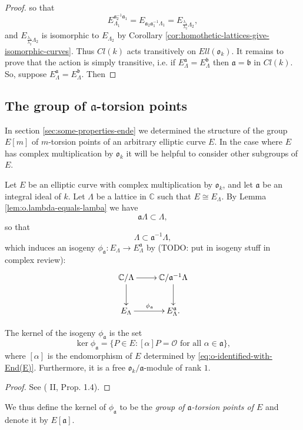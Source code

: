 \begin{proof}
  so that
  \begin{equation*}
    E_{\Lambda_{1}}^{\mathfrak{a}_{2}^{-1}\mathfrak{a}_{1}} =
    E_{\mathfrak{a}_{2}\mathfrak{a}_{1}^{-1}\Lambda_{1}} = E_{\frac{\lambda_{1}}{\lambda_{2}}\Lambda_{2}},
  \end{equation*}
  and $E_{\frac{\lambda_{1}}{\lambda_{2}}\Lambda_{2}}$ is isomorphic to
  $E_{\Lambda_{2}}$ by Corollary
  \ref{cor:homothetic-lattices-give-isomorphic-curves}.  Thus $Cl(k)$ acts
  transitively on $Ell(\mathfrak{o}_{k})$.  It remains to prove that the action is
  simply transitive, i.e. if $E_{\Lambda}^{\mathfrak{a}} =
  E_{\Lambda}^{\mathfrak{b}}$ then $\mathfrak{a} = \mathfrak{b}$ in $Cl(k)$.  So,
  suppose $E_{\Lambda}^{\mathfrak{a}} = E_{\Lambda}^{\mathfrak{b}}$.  Then 
\end{proof}

\subsection{The group of $\mathfrak{a}$-torsion points}
\label{sec:group-a-tors}

In section \ref{sec:some-properties-ende} we determined the structure of the group
$E[m]$ of $m$-torsion points of an arbitrary elliptic curve $E$.  In the case where
$E$ has complex multiplication by $\mathfrak{o}_{k}$ it will be helpful to consider
other subgroups of $E$.

Let $E$ be an elliptic curve with complex multiplication by $\mathfrak{o}_{k}$, and
let $\mathfrak{a}$ be an integral ideal of $k$.  Let $\Lambda$ be a lattice in
$\mathbb{C}$ such that $E \cong E_{\Lambda}$.  By Lemma
\ref{lem:o.lambda-equals-lamba} we have
\begin{equation*}
  \mathfrak{a}\Lambda \subset \Lambda,
\end{equation*}
so that
\begin{equation*}
  \Lambda \subset \mathfrak{a}^{-1}\Lambda,
\end{equation*}
which induces an isogeny $\phi_{\mathfrak{a}} : E_{\Lambda} \rightarrow
E_{\Lambda}^{\mathfrak{a}}$ by (TODO: put in isogeny stuff in complex review):
\begin{equation*}
  \xymatrix{
    \mathbb{C} / \Lambda \ar[d] \ar[r] & \mathbb{C} / \mathfrak{a}^{-1}\Lambda \ar[d] \\
    E_{\Lambda} \ar[r]^{\phi_{\mathfrak{a}}} & E_{\Lambda}^{\mathfrak{a}}.
  }
\end{equation*}
\begin{prop}
  \label{prop:a-torsion-is-kernel}
  The kernel of the isogeny $\phi_{\mathfrak{a}}$ is the set
  \begin{equation*}
    \ker{\phi_{\mathfrak{a}}} = \{ P \in E : [\alpha]P = \mathcal{O} \text{ for all } \alpha
    \in \mathfrak{a} \},
  \end{equation*}
  where $[\alpha]$ is the endomorphism of $E$ determined by
  \eqref{eq:o-identified-with-End(E)}.  Furthermore, it is a free $\mathfrak{o}_{k} /
  \mathfrak{a}$-module of rank $1$.
\end{prop}
\begin{proof}
  See (\cite{silverman94} II, Prop. 1.4).
\end{proof}

We thus define the kernel of $\phi_{\mathfrak{a}}$ to be the \emph{group of
  $\mathfrak{a}$-torsion points of $E$} and denote it by $E[\mathfrak{a}]$.

